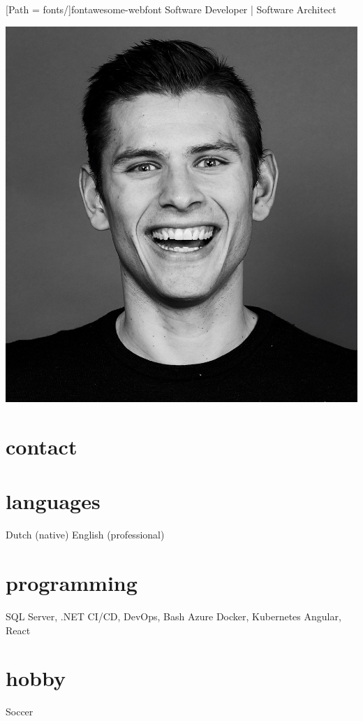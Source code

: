 \documentclass[]{friggeri-cv}
\begin{document}
\newfontfamily{\FA}[Path = fonts/]{fontawesome-webfont}
       {Software Developer | Software Architect}

\begin{aside}
  \includegraphics[width=\textwidth]{profilePicture.jpg}
  \section{contact}
    \href{https://www.google.com/maps/place/Tilburg}{{\FA \faMapMarker}}
    \href{mailto:pietervdheijden@gmail.com}{{\FA \faEnvelope}}
    \href{https://linkedin.com/in/pietervdheijden}{{\FA \faLinkedin}}
    \href{https://github.com/pietervdheijden}{{\FA \faGithub}}
    \href{https://twitter.com/pieterheijden}{{\FA \faTwitter}}
  \section{languages}
    Dutch (native)
    English (professional)
  \section{programming}
    {SQL Server, .NET}
    {CI/CD, DevOps, Bash}
    {Azure}
    {Docker, Kubernetes}
    {Angular, React}
  \section{hobby}
    Soccer
\end{aside}
\end{document}
